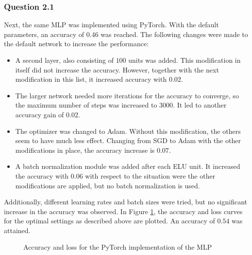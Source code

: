 \documentclass{article}
\begin{document}
\subsubsection*{Question 2.1}
Next, the same MLP was implemented using PyTorch. With the default parameters, an accuracy of 0.46 was reached. The following changes were made to the default network to increase the performance:
\begin{itemize}
	\item A second layer, also consisting of $100$ units was added. This modification in itself did not increase the accuracy. However, together with the next modification in this list, it increased accuracy with $0.02$.
	\item The larger network needed more iterations for the accuracy to converge, so the maximum number of steps was increased to $3000$. It led to another accuracy gain of $0.02$.
	\item The optimizer was changed to Adam. Without this modification, the others seem to have much less effect. Changing from SGD to Adam with the other modifications in place, the accuracy increase is $0.07$.
	\item A batch normalization module was added after each ELU unit. It increased the accuracy with $0.06$ with respect to the situation were the other modifications are applied, but no batch normalization is used.
\end{itemize}
Additionally, different learning rates and batch sizes were tried, but no significant increase in the accuracy was observed. In Figure \ref{fig:torchcurves}, the accuracy and loss curves for the optimal settings as described above are plotted. An accuracy of $0.54$ was attained.
\begin{figure}[H]
	\centering
	\caption{Accuracy and loss for the PyTorch implementation of the MLP}
	\label{fig:torchcurves}
\end{figure}
\end{document}

